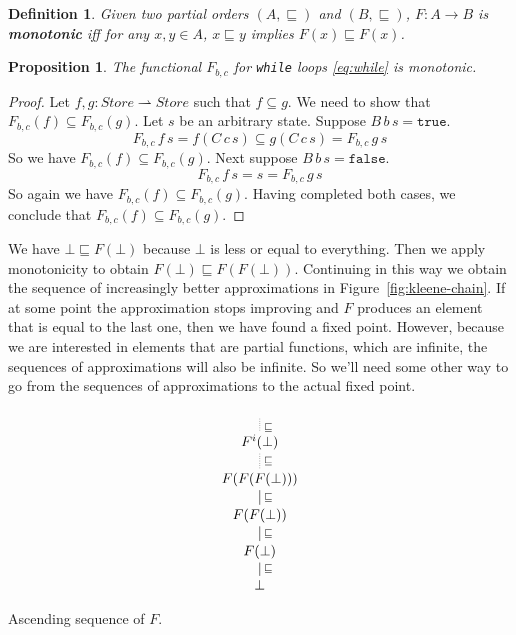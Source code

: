 \documentclass{tufte-handout}
\newcommand{\TRUE}[0]{\mathtt{true}}
\newcommand{\FALSE}[0]{\mathtt{false}}
\newcommand{\pto}[0]{\rightharpoonup}
\newcommand{\STORE}[0]{\mathit{Store}}
\newtheorem{proposition}[theorem]{Proposition}
\newtheorem{definition}{Definition}%
\begin{document}
\begin{definition}
  Given two partial orders $(A,\sqsubseteq)$ and
  $(B,\sqsubseteq)$, $F : A {\to} B$ is \textbf{\emph{monotonic}} iff
  for any $x,y\in A$, $x \sqsubseteq y$ implies $F(x) \sqsubseteq F(x)$.
\end{definition}

\begin{proposition}
  The functional $F_{b,c}$ for \texttt{while} loops \eqref{eq:while}
  is monotonic.
\end{proposition}
\begin{proof}
  Let $f, g : \STORE \pto \STORE$ such that
  $f \subseteq g$. We need to show that $F_{b,c}(f) \subseteq
  F_{b,c}(g)$. 
  Let $s$ be an arbitrary state. Suppose $B\,b\,s = \TRUE$.
  \[
  F_{b,c}\,f\,s = f(C\,c\,s) \subseteq g(C\,c\,s) = F_{b,c}\,g\,s 
  \]
  So we have $F_{b,c}(f) \subseteq F_{b,c}(g)$.
  Next suppose $B\,b\,s = \FALSE$.
  \[
  F_{b,c}\,f\,s = s
               = F_{b,c}\,g\,s 
  \]
  So again we have $F_{b,c}(f) \subseteq F_{b,c}(g)$.  Having
  completed both cases, we conclude that $F_{b,c}(f) \subseteq
  F_{b,c}(g)$.
\end{proof}


We have $\bot \sqsubseteq F(\bot)$ because $\bot$ is less or equal to
everything. Then we apply monotonicity to obtain $F(\bot) \sqsubseteq
F(F(\bot))$.  Continuing in this way we obtain the sequence of
increasingly better approximations in Figure~\ref{fig:kleene-chain}.
If at some point the approximation stops improving and $F$ produces an
element that is equal to the last one, then we have found a fixed
point. However, because we are interested in elements that are partial
functions, which are infinite, the sequences of approximations will
also be infinite. So we'll need some other way to go from the
sequences of approximations to the actual fixed point.

\begin{marginfigure}
\[
  \xymatrix@=10pt{
    \ar@{..}^{\sqsubseteq}[d]\\
    F^i(\bot) \ar@{..}^{\sqsubseteq}[d]\\
    F(F(F(\bot))) \ar@{-}^{\sqsubseteq}[d]\\
    F(F(\bot)) \ar@{-}^{\sqsubseteq}[d]\\
    F(\bot) \ar@{-}^{\sqsubseteq}[d]\\
    \bot
  }
\]
\caption{Ascending sequence of $F$.}
\label{fig:kleene-chain}
\end{marginfigure}
\end{document}
